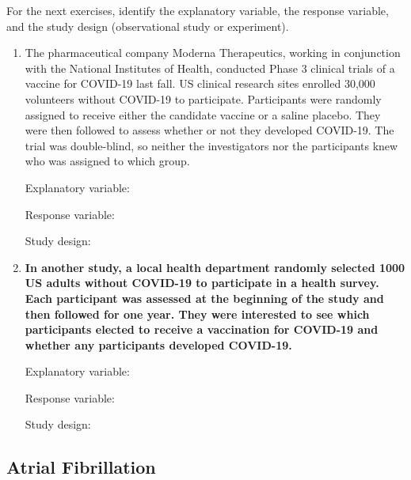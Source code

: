 \documentclass[
]{report}
\begin{document}
For the next exercises, identify the explanatory variable, the response variable, and the study design (observational study or experiment).

\newpage

\begin{enumerate}
\def\labelenumi{\arabic{enumi}.}
\item
  The pharmaceutical company Moderna Therapeutics, working in conjunction with the National Institutes of Health, conducted Phase 3 clinical trials of a vaccine for COVID-19 last fall. US clinical research sites enrolled 30,000 volunteers without COVID-19 to participate. Participants were randomly assigned to receive either the candidate vaccine or a saline placebo. They were then followed to assess whether or not they developed COVID-19. The trial was double-blind, so neither the investigators nor the participants knew who was assigned to which group.
  \vspace{0.1in}

  Explanatory variable:
  \vspace{0.25in}

  Response variable:
  \vspace{0.25in}

  Study design:
  \vspace{0.25in}
\item
  \textbf{In another study, a local health department randomly selected 1000 US adults without COVID-19 to participate in a health survey. Each participant was assessed at the beginning of the study and then followed for one year. They were interested to see which participants elected to receive a vaccination for COVID-19 and whether any participants developed COVID-19.}
  \vspace{0.1in}

  Explanatory variable:
  \vspace{0.25in}

  Response variable:
  \vspace{0.25in}

  Study design:
  \vspace{0.25in}
\end{enumerate}

\hypertarget{atrial-fibrillation}{%
\subsection{Atrial Fibrillation}\label{atrial-fibrillation}}
\end{document}

